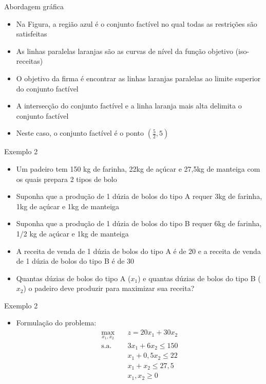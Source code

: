 \documentclass[10pt]{beamer}
\begin{document}
\begin{frame}{Abordagem gráfica}
    \begin{itemize}
        \item Na Figura, a região azul é o conjunto factível no qual todas as restrições são satisfeitas\bigskip
        \item As linhas paralelas laranjas são as curvas de nível da função objetivo (iso-receitas)\bigskip
        \item O objetivo da firma é encontrar as linhas laranjas paralelas ao limite superior do conjunto factível\bigskip
        \item A intersecção do conjunto factível e a linha laranja mais alta delimita o conjunto factível\bigskip
        \item Neste caso, o conjunto factível é o ponto $\left(\frac{5}{2}, 5\right)$
    \end{itemize}
\end{frame}

\begin{frame}{Exemplo 2}    
    \begin{itemize}
            \item Um padeiro tem 150 kg de farinha, 22kg de açúcar e 27,5kg de manteiga com os quais prepara 2 tipos de bolo\bigskip
            \item Suponha que a produção de 1 dúzia de bolos do tipo A requer 3kg de farinha, 1kg de açúcar e 1kg de manteiga\bigskip
            \item Suponha que a produção de 1 dúzia de bolos do tipo B requer 6kg de farinha, 1/2 kg de açúcar e 1kg de manteiga\bigskip
            \item A receita de venda de 1 dúzia de bolos do tipo A é de 20 e a receita de venda de 1 dúzia de bolos do tipo B é de 30\bigskip
            \item Quantas dúzias de bolos do tipo A ($x_1$) e quantas dúzias de bolos do tipo B ($x_2$) o padeiro deve produzir para maximizar sua receita?
    \end{itemize}
\end{frame}

\begin{frame}{Exemplo 2}
    \begin{itemize}
        \item Formulação do problema:
        \begin{align*}
            \max_{x_1,x_2} \quad & z = 20x_1 + 30x_2\\
            \text{s.a.} \quad & 3x_1 + 6x_2 \leq 150\\
            & x_1 + 0,5x_2 \leq 22\\
            & x_1 + x_2 \leq 27,5 \\
            & x_1, x_2 \geq 0
        \end{align*}
    \end{itemize}
\end{frame}
\end{document}
